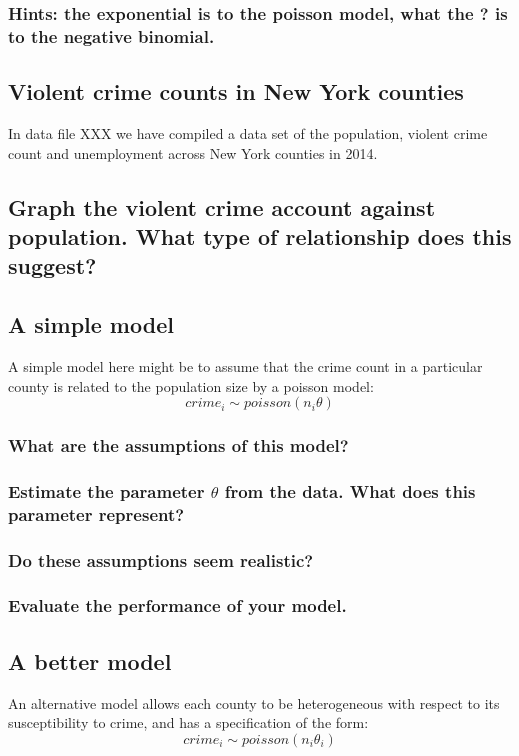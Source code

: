 \documentclass[11pt,fullpage]{book}
\begin{document}
\subsubsection{Hints: the exponential is to the poisson model, what the ? is to the negative binomial.}

\subsection{Violent crime counts in New York counties}
In data file XXX we have compiled a data set of the population, violent crime count and unemployment across New York counties in 2014. 

\subsection{Graph the violent crime account against population. What type of relationship does this suggest?}
\subsection{A simple model}
A simple model here might be to assume that the crime count in a particular county is related to the population size by a poisson model:
\begin{equation}
crime_i \sim poisson(n_i\theta)
\end{equation}
\subsubsection{What are the assumptions of this model?}
\subsubsection{Estimate the parameter $\theta$ from the data. What does this parameter represent?}
\subsubsection{Do these assumptions seem realistic?}
\subsubsection{Evaluate the performance of your model.}

\subsection{A better model}
An alternative model allows each county to be heterogeneous with respect to its susceptibility to crime, and has a specification of the form:
\begin{equation}
crime_i \sim poisson(n_i\theta_i)
\end{equation}
\end{document}

